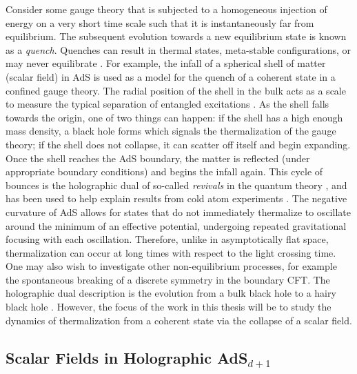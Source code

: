 \documentclass[../PhD.tex]{subfiles}
\begin{document}
Consider some gauge theory that is subjected to a homogeneous injection of energy on a very short time scale such that it is instantaneously far from equilibrium. The subsequent evolution towards a new equilibrium state is known as a \emph{quench}. Quenches can result in thermal states, meta-stable configurations, or may never equilibrate \cite{1103.2683}. For example, the infall of a spherical shell of matter (scalar field) in AdS is used as a model for the quench of a coherent state in a confined gauge theory. The radial position of the shell in the bulk acts as a scale to measure the typical separation of entangled excitations \cite{0705.0016}. As the shell falls towards the origin, one of two things can happen: if the shell has a high enough mass density, a black hole forms which signals the thermalization of the gauge theory; if the shell does not collapse, it can scatter off itself and begin expanding. Once the shell reaches the AdS boundary, the matter is reflected (under appropriate boundary conditions) and begins the infall again. This cycle of bounces is the holographic dual of so-called \emph{revivals} in the quantum theory \cite{1410.6201, 1412.6002}, and has been used to help explain results from cold atom experiments \cite{Dziarmaga2010, 2011arXiv1106.3567L}. The negative curvature of AdS allows for states that do not immediately thermalize to oscillate around the minimum of an effective potential, undergoing repeated gravitational focusing with each oscillation. Therefore, unlike in asymptotically flat space, thermalization can occur at long times with respect to the light crossing time. One may also wish to investigate other non-equilibrium processes, for example the spontaneous breaking of a discrete symmetry in the boundary CFT. The holographic dual description is the evolution from a bulk black hole to a hairy black hole \cite{1704.05454, 1902.08669}. However, the focus of the work in this thesis will be to study the dynamics of thermalization from a coherent state via the collapse of a scalar field.


\subsection{Scalar Fields in Holographic AdS$_{d+1}$}
\label{ssec: scalar fields}
\end{document}
